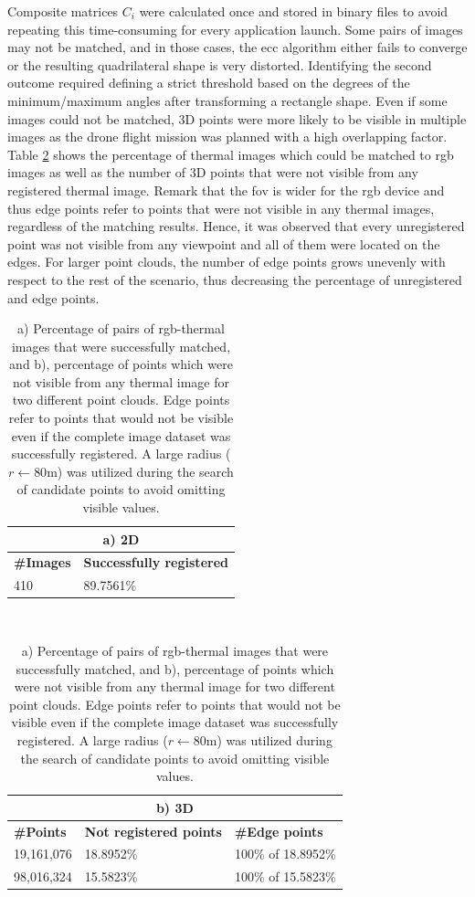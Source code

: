 Composite matrices $C_i$ were calculated once and stored in binary files to avoid repeating this time-consuming for every application launch. Some pairs of images may not be matched, and in those cases, the \acrshort{ecc} algorithm either fails to converge or the resulting quadrilateral shape is very distorted. Identifying the second outcome required defining a strict threshold based on the degrees of the minimum/maximum angles after transforming a rectangle shape. Even if some images could not be matched, 3D points were more likely to be visible in multiple images as the drone flight mission was planned with a high overlapping factor. Table \ref{table:image_registration_statistics} shows the percentage of thermal images which could be matched to \acrshort{rgb} images as well as the number of 3D points that were not visible from any registered thermal image. Remark that the \acrshort{fov} is wider for the \acrshort{rgb} device and thus edge points refer to points that were not visible in any thermal images, regardless of the matching results. Hence, it was observed that every unregistered point was not visible from any viewpoint and all of them were located on the edges. For larger point clouds, the number of edge points grows unevenly with respect to the rest of the scenario, thus decreasing the percentage of unregistered and edge points.

\begin{table}
    \sffamily
    \caption{a) Percentage of pairs of \acrshort{rgb}-thermal images that were successfully matched, and b), percentage of points which were not visible from any thermal image for two different point clouds. Edge points refer to points that would not be visible even if the complete image dataset was successfully registered. A large radius ($r \gets 80$\si{\meter}) was utilized during the search of candidate points to avoid omitting visible values.}
    \label{table:image_registration_statistics}
    \begin{tabular}{l@{\hskip 0.3in}l@{}}
        \multicolumn{2}{c}{a) 2D}\\
        \midrule
        \textbf{\#Images} & \textbf{Successfully registered}\\
        \midrule
        410 & 89.7561\% \\
        \bottomrule
    \end{tabular}\\[2mm]
    \begin{tabular}{l@{\hskip 0.3in}l@{\hskip 0.3in}l@{}}
        \multicolumn{3}{c}{b) 3D}\\
        \midrule
        \textbf{\#Points} & \textbf{Not registered points} & \textbf{\#Edge points}\\
        \midrule
        19,161,076 & 18.8952\% & 100\% of 18.8952\%\\
        98,016,324 & 15.5823\% & 100\% of 15.5823\%\\
        \bottomrule
    \end{tabular}
\end{table}

